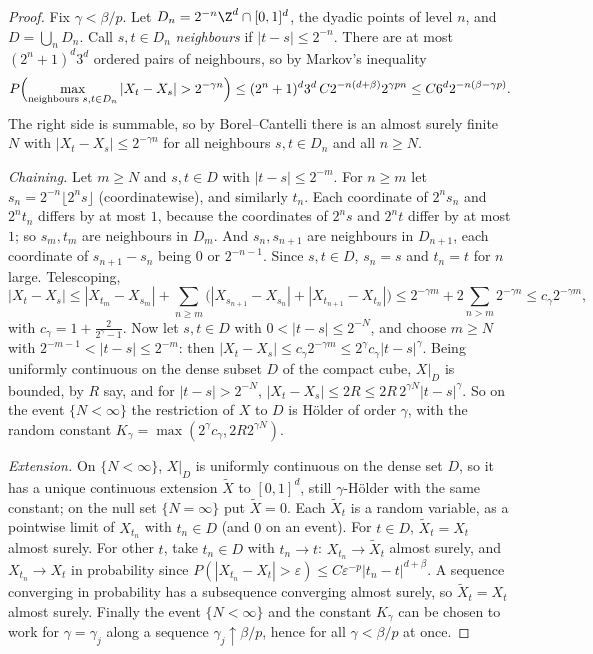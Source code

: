 \begin{proof}
Fix $\gamma<\beta/p$. Let $D_n=2^{-n}\Z^d\cap[0,1]^d$, the dyadic points of level $n$, and $D=\bigcup_nD_n$. Call $s,t\in D_n$ \emph{neighbours} if $|t-s|\le2^{-n}$. There are at most $(2^n+1)^d3^d$ ordered pairs
of neighbours, so by Markov's inequality
\[
P\Bigl(\max_{\text{neighbours }s,t\in D_n}|X_t-X_s|>2^{-\gamma n}\Bigr)\le(2^n+1)^d3^d\,C2^{-n(d+\beta)}2^{\gamma pn}\le C6^d2^{-n(\beta-\gamma p)}.
\]
The right side is summable, so by Borel--Cantelli there is an almost surely finite $N$ with $|X_t-X_s|\le2^{-\gamma n}$ for all neighbours $s,t\in D_n$ and all $n\ge N$.

\emph{Chaining.} Let $m\ge N$ and $s,t\in D$ with $|t-s|\le2^{-m}$. For $n\ge m$ let $s_n=2^{-n}\lfloor2^ns\rfloor$ (coordinatewise), and similarly $t_n$. Each coordinate of $2^ns_n$ and $2^nt_n$ differs by at most
$1$, because the coordinates of $2^ns$ and $2^nt$ differ by at most $1$; so $s_m,t_m$ are neighbours in $D_m$. And $s_n,s_{n+1}$ are neighbours in $D_{n+1}$, each coordinate of $s_{n+1}-s_n$ being $0$ or
$2^{-n-1}$. Since $s,t\in D$, $s_n=s$ and $t_n=t$ for $n$ large. Telescoping,
\[
|X_t-X_s|\le|X_{t_m}-X_{s_m}|+\sum_{n\ge m}\bigl(|X_{s_{n+1}}-X_{s_n}|+|X_{t_{n+1}}-X_{t_n}|\bigr)\le2^{-\gamma m}+2\sum_{n>m}2^{-\gamma n}\le c_\gamma2^{-\gamma m},
\]
with $c_\gamma=1+\frac2{2^\gamma-1}$. Now let $s,t\in D$ with $0<|t-s|\le2^{-N}$, and choose $m\ge N$ with $2^{-m-1}<|t-s|\le2^{-m}$: then $|X_t-X_s|\le c_\gamma2^{-\gamma m}\le2^\gamma c_\gamma|t-s|^\gamma$.
Being uniformly continuous on the dense subset $D$ of the compact cube, $X|_D$ is bounded, by $R$ say, and for $|t-s|>2^{-N}$, $|X_t-X_s|\le2R\le2R\,2^{\gamma N}|t-s|^\gamma$. So on the event
$\{N<\infty\}$ the restriction of $X$ to $D$ is H\"older of order $\gamma$, with the random constant $K_\gamma=\max(2^\gamma c_\gamma,2R2^{\gamma N})$.

\emph{Extension.} On $\{N<\infty\}$, $X|_D$ is uniformly continuous on the dense set $D$, so it has a unique continuous extension $\tilde X$ to $[0,1]^d$, still $\gamma$-H\"older with the same constant; on the null
set $\{N=\infty\}$ put $\tilde X=0$. Each $\tilde X_t$ is a random variable, as a pointwise limit of $X_{t_n}$ with $t_n\in D$ (and $0$ on an event). For $t\in D$, $\tilde X_t=X_t$ almost surely. For other $t$, take $t_n\in D$ with
$t_n\to t$: $X_{t_n}\to\tilde X_t$ almost surely, and $X_{t_n}\to X_t$ in probability since $P(|X_{t_n}-X_t|>\varepsilon)\le C\varepsilon^{-p}|t_n-t|^{d+\beta}$. A sequence converging in probability has a subsequence
converging almost surely, so $\tilde X_t=X_t$ almost surely. Finally the event $\{N<\infty\}$ and the constant $K_\gamma$ can be chosen to work for $\gamma=\gamma_j$ along a sequence $\gamma_j\uparrow\beta/p$, hence for all
$\gamma<\beta/p$ at once.
\end{proof}

